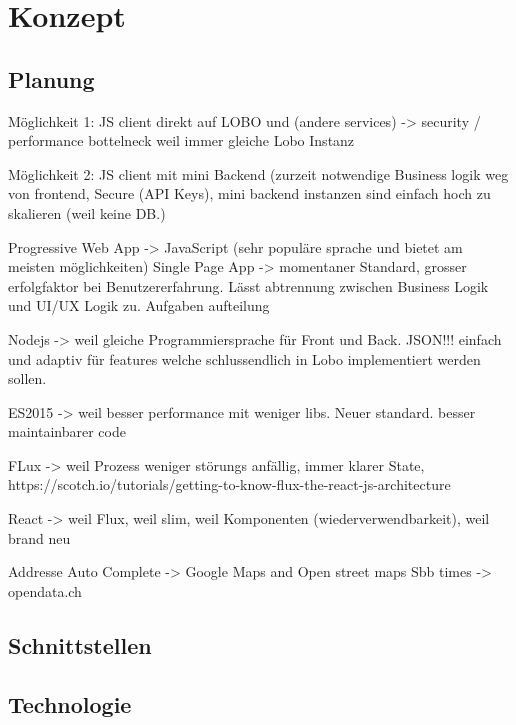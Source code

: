 \chapter{Konzept}
\label{sec:konzept}

\section{Planung}
Möglichkeit 1: JS client direkt auf LOBO und (andere services) -> security / performance bottelneck weil immer gleiche Lobo Instanz

Möglichkeit 2: JS client mit mini Backend (zurzeit notwendige Business logik weg von frontend, Secure (API Keys), mini backend instanzen sind einfach hoch zu skalieren (weil keine DB.)

Progressive Web App -> JavaScript (sehr populäre sprache und bietet am meisten möglichkeiten)
Single Page App -> momentaner Standard, grosser erfolgfaktor bei Benutzererfahrung.  Lässt abtrennung zwischen Business Logik und UI/UX Logik zu. Aufgaben aufteilung

Nodejs -> weil gleiche Programmiersprache für Front und Back. JSON!!! einfach und adaptiv für features welche schlussendlich in Lobo implementiert werden sollen.

ES2015 -> weil besser performance mit weniger libs. Neuer standard. besser maintainbarer code

FLux -> weil Prozess weniger störungs anfällig, immer klarer State,
https://scotch.io/tutorials/getting-to-know-flux-the-react-js-architecture

React -> weil Flux, weil slim, weil Komponenten (wiederverwendbarkeit), weil brand neu

Addresse Auto Complete -> Google Maps and Open street maps
Sbb times -> opendata.ch






\section{Schnittstellen}
\section{Technologie}
